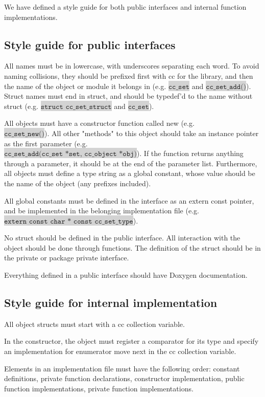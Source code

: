 \documentclass[table]{ituthesis}
\newcommand{\highlight}[1]{\colorbox{lightGray}{$\displaystyle \texttt{#1}$}}
\begin{document}
	We have defined a style guide for both public interfaces and internal function implementations.

	\subsection{Style guide for public interfaces}\label{sec:arch_style_public}
	
		\begin{description}
			\item All names must be in lowercase, with underscores separating each word. To avoid naming collisions, they should be prefixed first with cc for the library, and then the name of the object or module it belongs in (e.g. \highlight{cc\_set} and \highlight{cc\_set\_add()}). Struct names must end in struct, and should be typedef'd to the name without struct (e.g. \highlight{struct cc\_set\_struct} and \highlight{cc\_set}).
			\item All objects must have a constructor function called new (e.g. \\\highlight{cc\_set\_new()}). All other "methods" to this object should take an instance pointer as the first parameter (e.g. \\\highlight{cc\_set\_add(cc\_set *set, cc\_object *obj)}). If the function returns anything through a parameter, it should be at the end of the parameter list. Furthermore, all objects must define a type string as a global constant, whose value should be the name of the object (any prefixes included).
			\item All global constants must be defined in the interface as an extern const pointer, and be implemented in the belonging implementation file (e.g. \highlight{extern const char * const cc\_set\_type}).
			\item No struct should be defined in the public interface. All interaction with the object should be done through functions. The definition of the struct should be in the private or package private interface.
			\item Everything defined in a public interface should have Doxygen documentation.
		\end{description}
	
	\subsection{Style guide for internal implementation}\label{sec:arch_style_internal}
	
		\begin{description}
			\item All object structs must start with a cc collection variable.
			\item In the constructor, the object must register a comparator for its type and specify an
			implementation for enumerator move next in the cc collection variable.
			\item Elements in an implementation file must have the following order: constant definitions, private function declarations, constructor implementation, public function implementations, private function implementations.
		\end{description}
		
\end{document}
